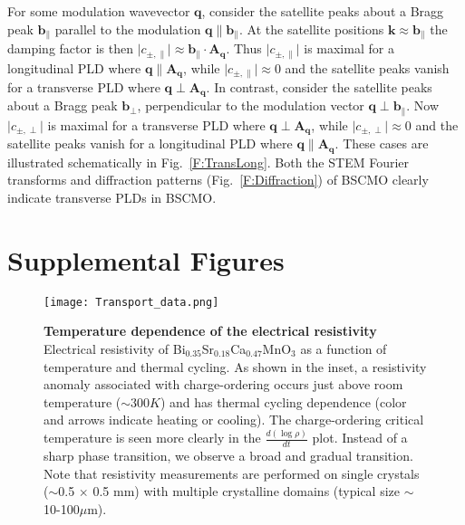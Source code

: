 \documentclass[12pt]{article}
\begin{document}
For some modulation wavevector $\mathbf{q}$, consider the satellite peaks about a Bragg peak $\mathbf{b}_{\parallel}$ parallel to the modulation $\mathbf{q} \parallel \mathbf{b}_\parallel$.  
At the satellite positions $\mathbf{k}\approx\mathbf{b}_\parallel$ the damping factor is then $\lvert c_{{\pm},\parallel}\rvert \approx \mathbf{b}_\parallel\cdot\mathbf{A}_{\mathbf{q}}$.
Thus $\lvert c_{{\pm},\parallel}\rvert$ is maximal for a longitudinal PLD where $\mathbf{q}\parallel\mathbf{A}_\mathbf{q}$, while $\lvert c_{{\pm},\parallel}\rvert \approx 0$ and the satellite peaks vanish for a transverse PLD where $\mathbf{q}\perp\mathbf{A}_\mathbf{q}$.
In contrast, consider the satellite peaks about a Bragg peak $\mathbf{b}_{\perp}$, perpendicular to the modulation vector $\mathbf{q} \perp \mathbf{b}_\parallel$.  
Now $\lvert c_{{\pm},\perp}\rvert$ is maximal for a transverse PLD where $\mathbf{q}\perp\mathbf{A}_\mathbf{q}$, while $\lvert c_{{\pm},\perp}\rvert \approx 0$ and the satellite peaks vanish for a longitudinal PLD where $\mathbf{q}\parallel\mathbf{A}_\mathbf{q}$.
These cases are illustrated schematically in Fig.~\ref{F:TransLong}.
Both the STEM Fourier transforms and diffraction patterns (Fig.~\ref{F:Diffraction}) of BSCMO clearly indicate transverse PLDs in BSCMO.





\newpage
\section*{Supplemental Figures}

\begin{figure}[h]
  \texttt{[image: Transport\_data.png]}
  \caption{\textbf{Temperature dependence of the electrical resistivity} 
Electrical resistivity of Bi$_{0.35}$Sr$_{0.18}$Ca$_{0.47}$MnO$_{3}$ as a function of temperature and thermal cycling.
As shown in the inset, a resistivity anomaly associated with charge-ordering occurs just above room temperature ($\sim300K$) and has thermal cycling dependence (color and arrows indicate heating or cooling).
The charge-ordering critical temperature is seen more clearly in the $\frac{d(\log\rho)}{dt}$ plot.
Instead of a sharp phase transition, we observe a broad and gradual transition.
Note that resistivity measurements are performed on single crystals ($\sim$0.5 $\times$ 0.5 mm) with multiple crystalline domains (typical size $\sim$10-100$\mu$m).
}
  \label{F:Transport}
\end{figure}
\end{document}
